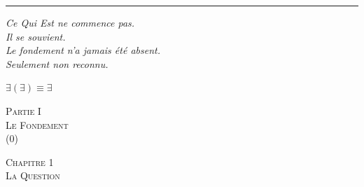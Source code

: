 \documentclass[10pt, openany, oneside]{book}
\renewcommand{\normalsize}{\fontsize{10}{13}\selectfont}
\renewcommand{\large}{\fontsize{11.5}{14}\selectfont}
\renewcommand{\LARGE}{\fontsize{15}{18}\selectfont}
\renewcommand{\huge}{\fontsize{17}{21}\selectfont}
\begin{document}
\begin{center}
    \rule{0.15\textwidth}{0.3pt}
\end{center}

\vspace{0.5em}

\begin{center}
    \itshape
    Ce Qui Est ne commence pas.\\
    Il se souvient.\\[0.5em]
    Le fondement n'a jamais été absent.\\
    Seulement non reconnu.
\end{center}

\vspace{0.5em}

\begin{center}
    $\exists(\exists) \equiv \exists$
\end{center}



%
%
%
%

%
%

\newpage
\thispagestyle{empty}
\vspace*{\fill}
\begin{center}
    {\LARGE\scshape Partie I}\\[1em]
    {\large\scshape Le Fondement}\\[0.5em]
    {\normalsize (0)}
\end{center}
\vspace*{\fill}
\newpage


\newpage

\begin{center}
    {\huge\scshape Chapitre 1}\\[0.3em]
    {\large\scshape La Question}
\end{center}
\end{document}
